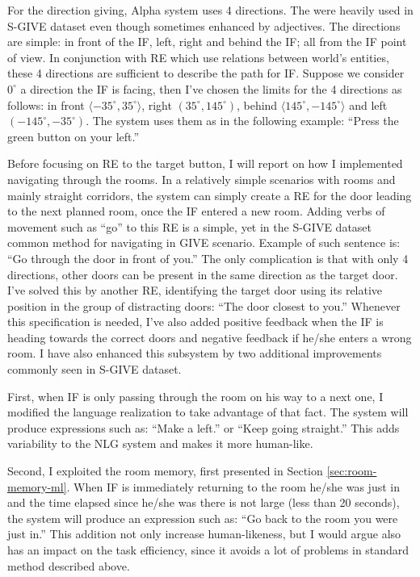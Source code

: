 For the direction giving, Alpha system uses 4 directions. The were heavily used in S-GIVE dataset even though sometimes enhanced by adjectives. The directions are simple: in front of the IF, left, right and behind the IF; all from the IF point of view. In conjunction with RE which use relations between world's entities, these 4 directions are sufficient to describe the path for IF. Suppose we consider $0^{\circ}$ a direction the IF is facing, then I've chosen the limits for the 4 directions as follows: in front $\langle-35^{\circ},35^{\circ}\rangle$, right $(35^{\circ},145^{\circ})$, behind $\langle145^{\circ},-145^{\circ}\rangle$ and left $(-145^{\circ},-35^{\circ})$. The system uses them as in the following example: ``Press the green button on your left.''

Before focusing on RE to the target button, I will report on how I implemented navigating through the rooms. In a relatively simple scenarios with rooms and mainly straight corridors, the system can simply create a RE for the door leading to the next planned room, once the IF entered a new room. Adding verbs of movement such as ``go'' to this RE is a simple, yet in the S-GIVE dataset common method for navigating in GIVE scenario. Example of such sentence is: ``Go through the door in front of you.'' The only complication is that with only 4 directions, other doors can be present in the same direction as the target door. I've solved this by another RE, identifying the target door using its relative position in the group of distracting doors: ``The door closest to you.'' Whenever this specification is needed, I've also added positive feedback when the IF is heading towards the correct doors and negative feedback if he/she enters a wrong room. I have also enhanced this subsystem by two additional improvements commonly seen in S-GIVE dataset.

First, when IF is only passing through the room on his way to a next one, I modified the language realization to take advantage of that fact. The system will produce expressions such as: ``Make a left.'' or ``Keep going straight.'' This adds variability to the NLG system and makes it more human-like.

Second, I exploited the room memory, first presented in Section \ref{sec:room-memory-ml}. When IF is immediately returning to the room he/she was just in and the time elapsed since he/she was there is not large (less than 20 seconds), the system will produce an expression such as: ``Go back to the room you were just in.'' This addition not only increase human-likeness, but I would argue also has an impact on the task efficiency, since it avoids a lot of problems in standard method described above.

